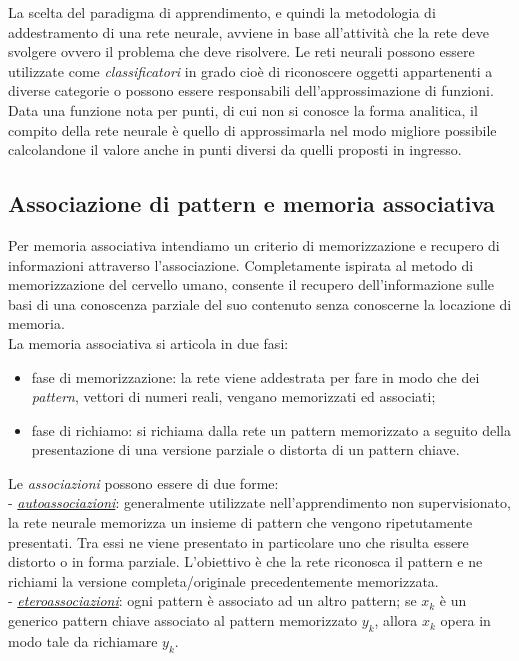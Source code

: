 \documentclass[12pt,a4paper,oneside]{book}
\begin{document}
		La scelta del paradigma di apprendimento, e quindi la metodologia di addestramento di una rete neurale, avviene in base all'attività che la rete deve svolgere ovvero il problema che deve risolvere. Le reti neurali possono essere utilizzate come \emph{classificatori} in grado cioè di riconoscere oggetti appartenenti a diverse categorie o possono essere responsabili dell'approssimazione di funzioni. Data una funzione nota per punti, di cui non si conosce la forma analitica, il compito della rete neurale è quello di approssimarla nel modo migliore possibile calcolandone il valore anche in punti diversi da quelli proposti in ingresso.\\
		
		\subsection{Associazione di pattern e memoria associativa}
		
		Per memoria associativa intendiamo un criterio di memorizzazione e recupero di informazioni attraverso l'associazione. Completamente ispirata al metodo di memorizzazione del cervello umano, consente il recupero dell'informazione sulle basi di una conoscenza parziale del suo contenuto senza conoscerne la locazione di memoria.\\
		\clearpage
		La memoria associativa si articola in due fasi:\\
		
		\begin{itemize}
		 \item fase di memorizzazione: la rete viene addestrata per fare in modo che dei \emph{pattern}, vettori di numeri reali, vengano memorizzati ed associati;
		 \item fase di richiamo: si richiama dalla rete un pattern memorizzato a seguito della presentazione di una versione parziale o distorta di un pattern chiave. 
		\end{itemize}
	
		Le \emph{associazioni} possono essere di due forme:\\ 
		- \underline{\emph{autoassociazioni}}: generalmente utilizzate nell'apprendimento non supervisionato, la rete neurale memorizza un insieme di pattern che vengono ripetutamente presentati. Tra essi ne viene presentato in particolare uno che risulta essere distorto o in forma parziale. L'obiettivo è che la rete riconosca il pattern e ne richiami la versione completa/originale precedentemente memorizzata.\\
		-  \underline{\emph{eteroassociazioni}}: ogni pattern è associato ad un altro pattern; se $x_{k}$ è un generico pattern chiave associato al pattern memorizzato $y_{k}$, allora $x_{k}$ opera in modo tale da richiamare $y_{k}$.
		
\end{document}
